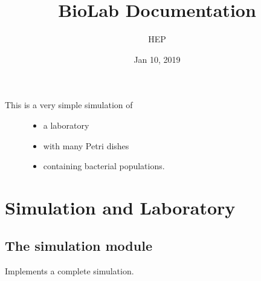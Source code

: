\documentclass[a4paper,10pt,english]{sphinxmanual}
\title{BioLab Documentation}
\date{Jan 10, 2019}
\author{HEP}
\begin{document}
\pagestyle{empty}
\maketitle
\pagestyle{plain}
\sphinxtableofcontents
\pagestyle{normal}
\label{\detokenize{index::doc}}

\begin{description}
\item[{This is a very simple simulation of}] \leavevmode\begin{itemize}
\item {} 
a laboratory

\item {} 
with many Petri dishes

\item {} 
containing bacterial populations.

\end{itemize}

\end{description}


\chapter{Simulation and Laboratory}
\label{\detokenize{sim_and_lab:simulation-and-laboratory}}\label{\detokenize{sim_and_lab::doc}}

\section{The simulation module}
\label{\detokenize{sim_and_lab:module-biolab.simulation}}\label{\detokenize{sim_and_lab:the-simulation-module}}
Implements a complete simulation.
\end{document}
